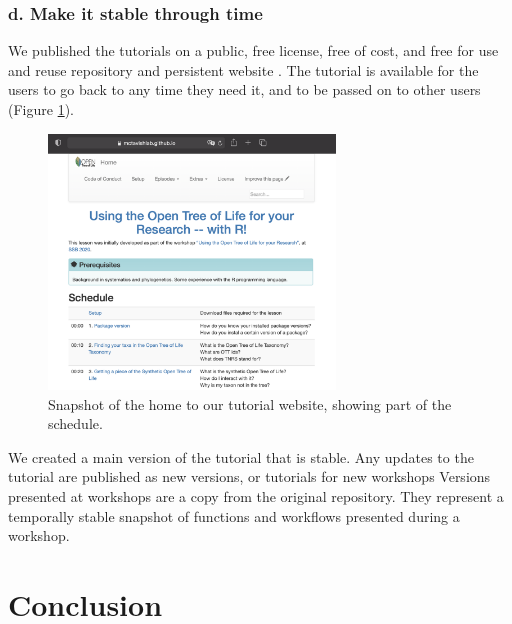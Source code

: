 \documentclass[12pt]{article}
\begin{document}
\subsubsection*{d. Make it stable through time}

We published the tutorials on a public, free license, free of cost, and free for
use and reuse repository and persistent website \citep{RopentreeTutorials}.
The tutorial is available for the users to go back to any time they need it,
and to be passed on to other users (Figure \ref{fig:schedule}).

\begin{figure}
\begin{center}
\includegraphics[width=3in]{fig-schedule.png}
\end{center}
\caption{Snapshot of the home to our tutorial website, showing part of the schedule. \label{fig:schedule}}
\end{figure}

We created a main version of the tutorial that is stable. Any updates to the tutorial are
published as new versions, or tutorials for new workshops \citep{wilson2006swc, SWCwebsite}
 Versions presented at workshops are a copy from the original repository.
They represent a temporally stable snapshot of functions and workflows presented
during a workshop.


\section*{Conclusion}
\label{sec:conclusion}
\end{document}
